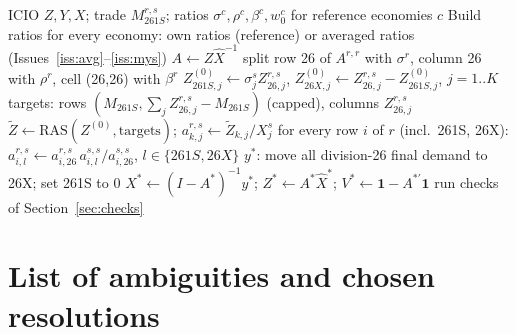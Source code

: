 \documentclass[11pt,a4paper]{article}
\theoremstyle{remark}
\theoremstyle{definition}
\newcommand{\sem}{{261S}}   %
\newcommand{\oth}{{26X}}    %
\newcommand{\agg}{{26}}     %
\newcommand{\tZ}{\tilde{Z}}
\begin{document}
\begin{algorithm}[H]
\caption{Semiconductor split of ICIO (one year $t$)}
\begin{algorithmic}[1]
\Require ICIO $Z,Y,X$; trade $M^{r,s}_\sem$; ratios $\sigma^c,\rho^c,\beta^c,w^c_0$ for reference economies $c$
\State Build ratios for every economy: own ratios (reference) or averaged ratios (Issues~\ref{iss:avg}--\ref{iss:mys})
\State $A \gets Z\hat X^{-1}$
 
  \State split row 26 of $A^{r,r}$ with $\sigma^r$, column 26 with $\rho^r$, cell (26,26) with $\beta^r$
\EndFor
{} 
  \State $Z^{(0)}_{\sem,j}\gets \sigma^s_j Z^{r,s}_{\agg,j}$, $Z^{(0)}_{\oth,j}\gets Z^{r,s}_{\agg,j}-Z^{(0)}_{\sem,j}$, $j=1..K$
  \State targets: rows $(M_\sem, \sum_j Z^{r,s}_{\agg,j}-M_\sem)$ (capped), columns $Z^{r,s}_{\agg,j}$
  \State $\tZ\gets\mathrm{RAS}(Z^{(0)},\text{targets})$; \quad $a^{r,s}_{k,j}\gets \tZ_{k,j}/X^s_j$
\EndFor
{} 
  \State for every row $i$ of $r$ (incl.\ \sem, \oth): $a^{r,s}_{i,l}\gets a^{r,s}_{i,\agg}\,a^{s,s}_{i,l}/a^{s,s}_{i,\agg}$, $l\in\{\sem,\oth\}$
\EndFor
\State $y^\ast$: move all division-26 final demand to \oth; set \sem{} to 0
\State $X^\ast\gets(I-A^\ast)^{-1}y^\ast$; \quad $Z^\ast\gets A^\ast\hat X^\ast$; \quad $V^\ast\gets \mathbf 1 - A^{\ast\prime}\mathbf 1$
\State run checks of Section~\ref{sec:checks}
\end{algorithmic}
\end{algorithm}

\section{List of ambiguities and chosen resolutions}
\end{document}
